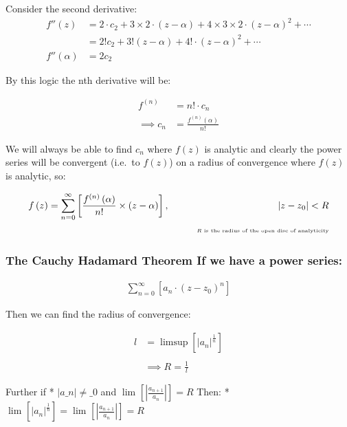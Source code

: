 \documentclass[class=article, crop=false]{standalone}
\begin{document}
Consider the second derivative:
\begin{align*}
  f''\left( z \right) &= 2\cdot c_2+ 3\times 2\cdot \left( z- \alpha \right) + 4\times 3\times 2\cdot \left( z- \alpha \right) ^2+  \cdots\\
  &= 2!c_2 +  3!\left( z- \alpha \right) + 4!\cdot \left( z- \alpha \right) ^2+  \cdots\\
  f''\left( \alpha \right) &= 2c_2
\end{align*}

By this logic the nth derivative will be:

\begin{align*}
  f^{\left( n \right) }&= n!\cdot c_n\\
  \implies  c_n&= \frac{f^{\left( n \right) }\left( \alpha \right) }{n!}
\end{align*}

We will always be able to find \(c_n\) where \(f\left( z \right) \) is
analytic and clearly the power series will be convergent (i.e.~to
\(f\left( z \right) \)) on a radius of convergence where \(f\left( z
\right) \) is analytic, so:

\begin{align*}
  f\left( z \right) &= \sum^{\infty}_{n= 0}   \left[ \frac{f^{\left( n \right) }\left( \alpha \right) }{n!} \times \left( z- \alpha \right)  \right] , \qquad    & \left| z- z_0 \right| <R \\
  &&{\tiny \text{$R$ is the radius of the open disc of analyticity}}
\end{align*}

\subsubsection{The Cauchy Hadamard Theorem If we have a power series:}

\begin{align*}
\sum^{\infty}_{n= 0}   \left[ a_n\cdot \left( z- z_0 \right) ^n \right]
\end{align*}

Then we can find the radius of convergence:

\begin{align*}
  l&= \limsup{    \left[ \left| a_n \right| ^{\frac{1}{n}} \right] }\\
  \ \\
  & \implies  R = \frac{1}{l}
\end{align*}

Further if * \( \left\lvert{} a\_n \right\rvert{} \neq\_0\) and
\(\lim_{}\left[ \left| \frac{a_{n+ 1}}{a_n} \right| \right] = R\) Then:
*
\(\lim_{}\left[ \left| a_n \right| ^{\frac{1}{n}} \right] = \lim_{}\left[ \left| \frac{a_{n+ 1}}{a_n} \right| \right] = R\)
\end{document}
